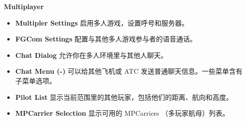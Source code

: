 \ifchinese
\item \textbf{Multiplayer}
 \begin{itemize}
  \item \textbf{Multipler Settings} 启用多人游戏，设置呼号和服务器。
  \item \textbf{FGCom Settings} 配置与其他多人游戏参与者的语音通话。
  \item \textbf{Chat Dialog} 允许你在多人环境里与其他人聊天。
  \item \textbf{Chat Menu (-)} 可以给其他飞机或 ATC 发送普通聊天信息。一些菜单含有子菜单选项。
  \item \textbf{Pilot List} 显示当前范围里的其他玩家，包括他们的距离、航向和高度。
  \item \textbf{MPCarrier Selection} 显示可用的 MPCarriers （多玩家航母）列表。
 \end{itemize}
\fi

